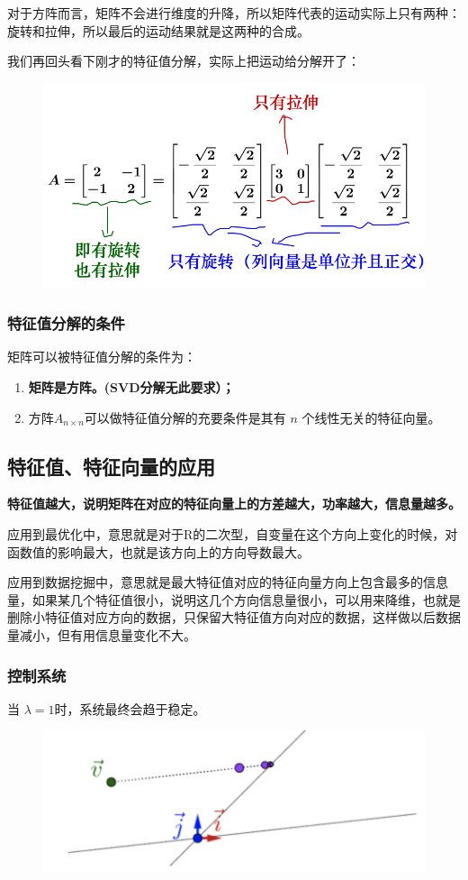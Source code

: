 \documentclass[12pt]{article}
\begin{document}
对于方阵而言，矩阵不会进行维度的升降，所以矩阵代表的运动实际上只有两种：旋转和拉伸，所以最后的运动结果就是这两种的合成。

我们再回头看下刚才的特征值分解，实际上把运动给分解开了：
\begin{figure}[H]
    \centering
    \includegraphics[width=.5\textwidth]{fig/UnderstandEigenValueVector_10.png}
\end{figure} 

\subsubsection{特征值分解的条件}
矩阵可以被特征值分解的条件为：
\begin{enumerate}
    \item \textbf{矩阵是方阵。(SVD分解无此要求）；}
    \item 方阵$A_{n\times n}$可以做特征值分解的充要条件是其有 $n$ 个线性无关的特征向量。
\end{enumerate}

\subsection{特征值、特征向量的应用}
\textbf{特征值越大，说明矩阵在对应的特征向量上的方差越大，功率越大，信息量越多。}

应用到最优化中，意思就是对于R的二次型，自变量在这个方向上变化的时候，对函数值的影响最大，也就是该方向上的方向导数最大。

应用到数据挖掘中，意思就是最大特征值对应的特征向量方向上包含最多的信息量，如果某几个特征值很小，说明这几个方向信息量很小，可以用来降维，也就是删除小特征值对应方向的数据，只保留大特征值方向对应的数据，这样做以后数据量减小，但有用信息量变化不大。

\subsubsection{控制系统}
当 $\lambda = 1时$，系统最终会趋于稳定。
\begin{figure}[H]
    \centering
    \includegraphics[width=.5\textwidth]{fig/UnderstandEigenValueVector_11.png}
\end{figure} 
\end{document}
